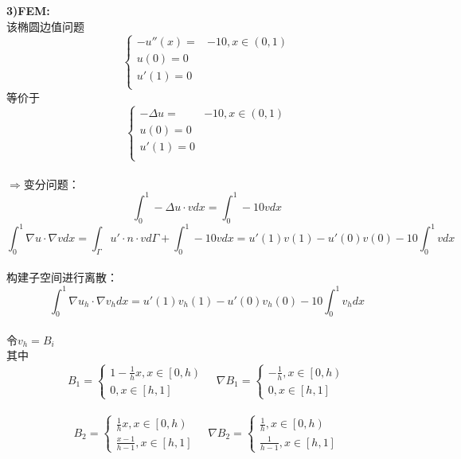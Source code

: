 \documentclass[a4paper,11pt,UTF8]{article}%
\theoremstyle{plain}
\begin{document}
	
	
	\indent\textbf{3)FEM:} \\ 
	该椭圆边值问题
	$$\left\{
	\begin{aligned}
		-u''\left(x\right)=&-10, x\in\left(0,1\right)\\
		u\left(0\right)=0\\
		u'\left(1\right)=0\\
	\end{aligned}
	\right.$$等价于
		$$\left\{
	\begin{aligned}
		-\Delta u=&-10, x\in\left(0,1\right)\\
		u\left(0\right)=0\\
		u'\left(1\right)=0\\
	\end{aligned}
	\right.$$\\
	$\Rightarrow$变分问题：\\
	$$\int_{0}^{1}-\Delta u\cdot vdx=\int_{0}^{1}-10vdx$$
	$$\int_{0}^{1}\nabla u\cdot \nabla vdx=\int_{\Gamma}u'\cdot n\cdot vd\Gamma +\int_{0}^{1}-10vdx=u'\left(1\right)v\left(1\right)-u'\left(0\right)v\left(0\right)-10\int_{0}^{1}vdx$$\\
	构建子空间进行离散：\\
		$$\int_{0}^{1}\nabla u_h\cdot \nabla v_hdx=u'\left(1\right)v_h\left(1\right)-u'\left(0\right)v_h\left(0\right)-10\int_{0}^{1}v_hdx$$\\
		令$v_h=B_i$\\
		其中$$B_1=\left\{
\begin{aligned}
	1-\frac{1}{h}x,x\in\left[0,h\right)\\
	0,x\in \left[h,1\right]
\end{aligned}		
\right.\quad
\nabla B_1=\left\{
\begin{aligned}
	-\frac{1}{h},x\in\left[0,h\right)\\
	0,x\in \left[h,1\right]
\end{aligned}\right.$$\\
\indent 
$$B_2=\left\{
\begin{aligned}
	\frac{1}{h}x,x\in\left[0,h\right)\\
	\frac{x-1}{h-1},x\in \left[h,1\right]
\end{aligned}		
\right.\quad
\nabla B_2=\left\{
\begin{aligned}
	\frac{1}{h},x\in\left[0,h\right)\\
	\frac{1}{h-1},x\in \left[h,1\right]
\end{aligned}\right.$$\\
~\\
\end{document}
